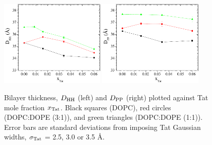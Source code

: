 \begin{figure}[htbp]
  \centering
  \includegraphics[width=0.45\textwidth]{figures/Tat/SDP_Results/DHH}
  \qquad
  \includegraphics[width=0.45\textwidth]{figures/Tat/SDP_Results/DPP}
  \caption[Bilayer thickness, $\DHH$ (left) and $\DPP$ (right)
  plotted against Tat mole fraction $\xTat$]
  {Bilayer thickness, $\DHH$ (left) and $\DPP$ (right)
  plotted against Tat mole fraction $\xTat$.
  Black squares (DOPC), red circles (DOPC:DOPE (3:1)), and green
  triangles (DOPC:DOPE (1:1)).
  Error bars are standard deviations from imposing Tat Gaussian widths, 
  $\sigma_\textrm{Tat}$ = 2.5, 3.0 or 3.5 \AA.}
  \label{fig:DHH_DPP}
\end{figure}

